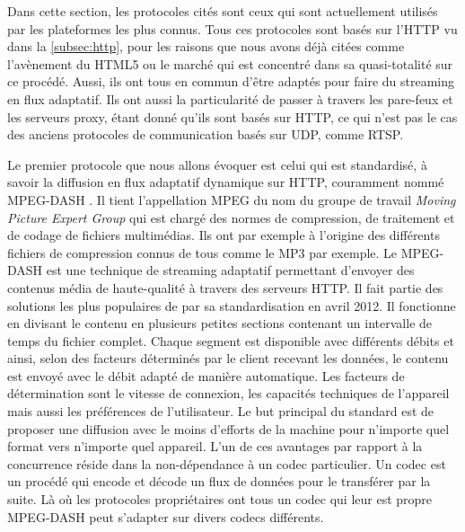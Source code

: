 \documentclass{polytech/polytech}
\begin{document}
Dans cette section, les protocoles cités sont ceux qui sont actuellement utilisés par les plateformes les plus connus. Tous ces protocoles sont basés sur l’HTTP vu dans la \autoref{subsec:http}, pour les raisons que nous avons déjà citées comme l’avènement du HTML5 ou le marché qui est concentré dans sa quasi-totalité sur ce procédé. Aussi, ils ont tous en commun d’être adaptés pour faire du streaming en flux adaptatif. Ils ont aussi la particularité de passer à travers les pare-feux et les serveurs proxy, étant donné qu’ils sont basés sur HTTP, ce qui n’est pas le cas des anciens protocoles de communication basés sur UDP, comme RTSP.

Le premier protocole que nous allons évoquer est celui qui est standardisé, à savoir la diffusion en flux adaptatif dynamique sur HTTP, couramment nommé MPEG-DASH \cite{_mpegdash_2017}. Il tient l’appellation MPEG du nom du groupe de travail \textit{Moving Picture Expert Group} qui est chargé des normes de compression, de traitement et de codage de fichiers multimédias. Ils ont par exemple à l’origine des différents fichiers de compression connus de tous comme le MP3 par exemple. Le MPEG-DASH est une technique de streaming adaptatif permettant d’envoyer des contenus média de haute-qualité à travers des serveurs HTTP. Il fait partie des solutions les plus populaires de par sa standardisation en avril 2012. Il fonctionne en divisant le contenu en plusieurs petites sections contenant un intervalle de temps du fichier complet. Chaque segment est disponible avec différents débits et ainsi, selon des facteurs déterminés par le client recevant les données, le contenu est envoyé avec le débit adapté de manière automatique. Les facteurs de détermination sont le vitesse de connexion, les capacités techniques de l’appareil mais aussi les préférences de l’utilisateur. Le but principal du standard est de proposer une diffusion avec le moins d’efforts de la machine pour n’importe quel format vers n’importe quel appareil. L’un de ces avantages par rapport à la concurrence réside dans la non-dépendance à un codec particulier. Un codec est un procédé qui encode et décode un flux de données pour le transférer par la suite. Là où les protocoles propriétaires ont tous un codec qui leur est propre MPEG-DASH peut s’adapter sur divers codecs différents.
\end{document}
